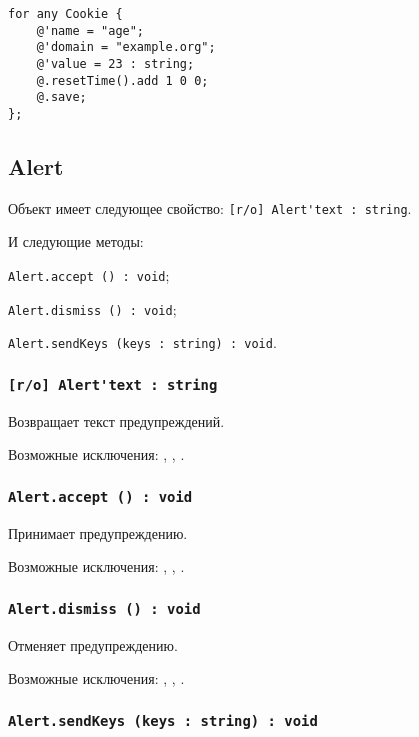 \begin{lstlisting}[caption=Создания новых cookie, label=newcookies]
for any Cookie {
	@'name = "age";
	@'domain = "example.org";
	@'value = 23 : string;
	@.resetTime().add 1 0 0;
	@.save;
};
\end{lstlisting}


\subsection{{\color{orange} Alert}}

Объект \alert{} имеет следующее свойство: \lstinline|[r/o] Alert'text : string|.

И следующие методы:
\begin{icItems}
	\item \lstinline|Alert.accept () : void|;
	\item \lstinline|Alert.dismiss () : void|;
	\item \lstinline|Alert.sendKeys (keys : string) : void|.
\end{icItems}

\subsubsection{\lstinline|[r/o] Alert'text : string|}

Возвращает текст предупреждений.

Возможные исключения: , , .

\subsubsection{\lstinline|Alert.accept () : void|}

Принимает предупреждению.

Возможные исключения: , , .

\subsubsection{\lstinline|Alert.dismiss () : void|}

Отменяет предупреждению.

Возможные исключения: , , .

\subsubsection{\lstinline|Alert.sendKeys (keys : string) : void|}

